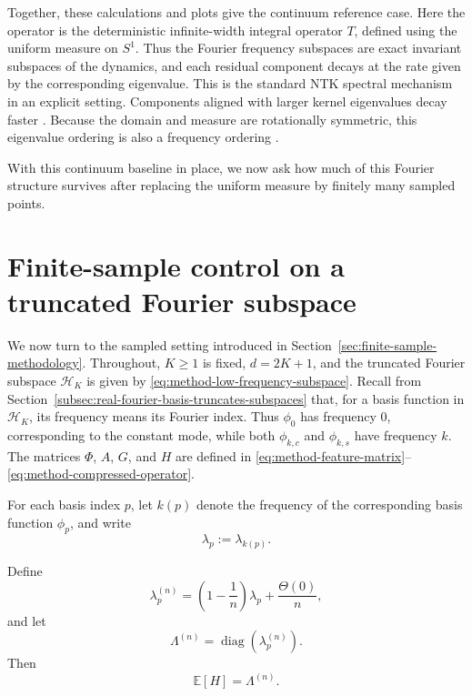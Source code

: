 Together, these calculations and plots give the continuum reference case. Here
the operator is the deterministic infinite-width integral operator \(T\), defined
using the uniform measure on \(S^1\). Thus the Fourier frequency subspaces are
exact invariant subspaces of the dynamics, and each residual component decays at
the rate given by the corresponding eigenvalue. This is the standard NTK
spectral mechanism in an explicit setting. Components aligned with larger kernel
eigenvalues decay faster
\citep{jacot2018ntk,lee2020wide,cao2020understandingspectralbiasdeep}. Because
the domain and measure are rotationally symmetric, this eigenvalue ordering is
also a frequency ordering
\citep{bietti2019inductivebiasneuraltangent,basri2019convergence,
	basri2020frequencybiasneuralnetworks}.

With this continuum baseline in place, we now ask how much of this Fourier
structure survives after replacing the uniform measure by finitely many sampled
points.

\section{Finite-sample control on a truncated Fourier subspace}
\label{sec:results-finite-sample}

We now turn to the sampled setting introduced in
Section~\ref{sec:finite-sample-methodology}. Throughout, \(K\geq 1\) is fixed,
\(d=2K+1\), and the truncated Fourier subspace \(\mathcal H_K\) is given by
\eqref{eq:method-low-frequency-subspace}. Recall from
Section~\ref{subsec:real-fourier-basis-truncates-subspaces} that, for a basis
function in \(\mathcal H_K\), its frequency means its Fourier index. Thus
\(\phi_0\) has frequency \(0\), corresponding to the constant mode, while both
\(\phi_{k,c}\) and \(\phi_{k,s}\) have frequency \(k\). The matrices
\(\Phi\), \(A\), \(G\), and \(H\) are defined in
\eqref{eq:method-feature-matrix}--\eqref{eq:method-compressed-operator}.

For each basis index \(p\), let \(k(p)\) denote the frequency of the corresponding basis
function \(\phi_p\), and write
\[
	\lambda_p:=\lambda_{k(p)}.
\]

\begin{proposition}
	\label{prop:results-expectation-H}
	Define
	\begin{equation}
		\lambda_p^{(n)}
		=
		\left(1-\frac{1}{n}\right)\lambda_p+\frac{\Theta(0)}{n},
		\label{eq:results-finite-sample-corrected-eigs}
	\end{equation}
	and let
	\begin{equation}
		\Lambda^{(n)}=\operatorname{diag}(\lambda_p^{(n)}).
		\label{eq:results-finite-sample-eigenvalue-matrix}
	\end{equation}
	Then
	\begin{equation}
		\mathbb E[H]=\Lambda^{(n)}.
		\label{eq:results-expected-H}
	\end{equation}
\end{proposition}

